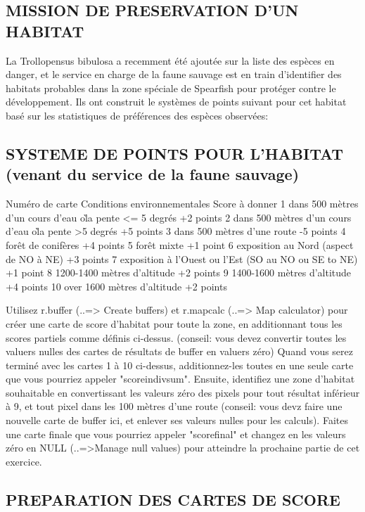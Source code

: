 \subsection{MISSION DE PRESERVATION D'UN HABITAT}
La Trollopensus bibulosa a recemment \'et\'e ajout\'ee sur la liste des esp\`eces en danger, et le service en charge de la faune sauvage est en train d'identifier des habitats probables dans la zone sp\'eciale de Spearfish pour prot\'eger contre le d\'eveloppement. Ils ont construit le syst\`emes de points suivant pour cet habitat bas\'e sur les statistiques de pr\'ef\'erences des esp\`eces observ\'ees:

\subsection{SYSTEME DE POINTS POUR L'HABITAT (venant du service de la faune sauvage) }

Num\'ero de carte Conditions environnementales Score \`a donner
1 dans 500 m\`etres d'un cours d'eau o\` la pente <= 5 degr\'es +2 points
2 dans 500 m\`etres d'un cours d'eau o\` la pente >5 degr\'es +5 points
3 dans 500 m\`etres d'une route -5 points
4 for\^et de conif\`eres +4 points
5 for\^et mixte +1 point
6 exposition au Nord (aspect de NO \`a NE) +3 points
7 exposition \`a l'Ouest ou l'Est (SO au NO ou SE to NE) +1 point
8 1200-1400 m\`etres d'altitude +2 points
9 1400-1600 m\`etres d'altitude +4 points
10 over 1600 m\`etres d'altitude +2 points

Utilisez r.buffer (..=> Create buffers) et r.mapcalc (..=> Map calculator) pour cr\'eer une carte de score d'habitat pour toute la zone, en additionnant tous les scores partiels comme d\'efinis ci-dessus. (conseil: vous devez convertir toutes les valuers nulles des cartes de r\'esultats de buffer en valuers z\'ero)
Quand vous serez termin\'e avec les cartes 1 \`a 10 ci-dessus, additionnez-les toutes en une seule carte que vous pourriez appeler "scoreindivsum". Ensuite, identifiez une zone d'habitat souhaitable en convertissant les valeurs z\'ero des pixels pour tout r\'esultat inf\'erieur \`a 9, et tout pixel dans les 100 m\`etres d'une route (conseil: vous devz faire une nouvelle carte de buffer ici, et enlever ses valeurs nulles pour les calculs). Faites une carte finale que vous pourriez appeler "scorefinal" et changez en les valeurs z\'ero en NULL (..=>Manage null values) pour atteindre la prochaine partie de cet exercice.

\subsection{PREPARATION DES CARTES DE SCORE}

